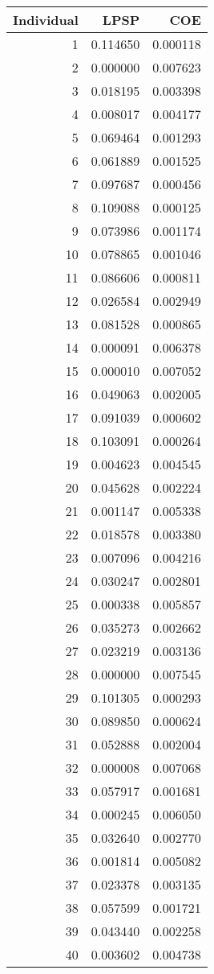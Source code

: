 \begin{tabular}{rrr}
\toprule
Individual & LPSP & COE \\
\midrule
1 & 0.114650 & 0.000118 \\
2 & 0.000000 & 0.007623 \\
3 & 0.018195 & 0.003398 \\
4 & 0.008017 & 0.004177 \\
5 & 0.069464 & 0.001293 \\
6 & 0.061889 & 0.001525 \\
7 & 0.097687 & 0.000456 \\
8 & 0.109088 & 0.000125 \\
9 & 0.073986 & 0.001174 \\
10 & 0.078865 & 0.001046 \\
11 & 0.086606 & 0.000811 \\
12 & 0.026584 & 0.002949 \\
13 & 0.081528 & 0.000865 \\
14 & 0.000091 & 0.006378 \\
15 & 0.000010 & 0.007052 \\
16 & 0.049063 & 0.002005 \\
17 & 0.091039 & 0.000602 \\
18 & 0.103091 & 0.000264 \\
19 & 0.004623 & 0.004545 \\
20 & 0.045628 & 0.002224 \\
21 & 0.001147 & 0.005338 \\
22 & 0.018578 & 0.003380 \\
23 & 0.007096 & 0.004216 \\
24 & 0.030247 & 0.002801 \\
25 & 0.000338 & 0.005857 \\
26 & 0.035273 & 0.002662 \\
27 & 0.023219 & 0.003136 \\
28 & 0.000000 & 0.007545 \\
29 & 0.101305 & 0.000293 \\
30 & 0.089850 & 0.000624 \\
31 & 0.052888 & 0.002004 \\
32 & 0.000008 & 0.007068 \\
33 & 0.057917 & 0.001681 \\
34 & 0.000245 & 0.006050 \\
35 & 0.032640 & 0.002770 \\
36 & 0.001814 & 0.005082 \\
37 & 0.023378 & 0.003135 \\
38 & 0.057599 & 0.001721 \\
39 & 0.043440 & 0.002258 \\
40 & 0.003602 & 0.004738 \\
\bottomrule
\end{tabular}
